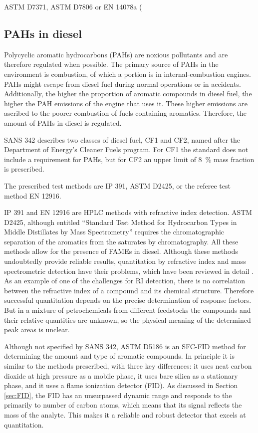 ASTM D7371,
ASTM D7806 or
EN 14078a (

\subsection{PAHs in diesel} 

Polycyclic aromatic hydrocarbons (PAHs) are noxious pollutants and are therefore
regulated when possible. The primary source of PAHs in the environment is
combustion, of which a portion is in internal-combustion engines.  PAHs might
escape from diesel fuel during normal operations or in accidents. Additionally,
the higher the proportion of aromatic compounds in diesel fuel, the higher the
PAH emissions of the engine that uses it. These higher emissions are ascribed to
the poorer combustion of fuels containing aromatics. Therefore, the amount of
PAHs in diesel is regulated.

SANS 342 describes two classes of diesel fuel, CF1 and CF2, named after the
Department of Energy's Cleaner Fuels program. For CF1 the standard does not
include a requirement for PAHs, but for CF2 an upper limit of \SI{8}{\percent}
mass fraction is prescribed.

The prescribed test methods are IP 391, ASTM D2425, or the referee test method
EN 12916.

IP 391 and  EN 12916 are HPLC methods with refractive index detection. ASTM
D2425, although entitled ``Standard Test Method for Hydrocarbon Types in Middle
Distillates by Mass Spectrometry'' requires the chromatographic separation of
the aromatics from the saturates by chromatography. All these methods allow for
the presence of FAMEs in diesel. Although these methods undoubtedly provide
reliable results, quantitation by refractive index and mass spectrometric
detection have their problems, which have been reviewed in detail
\autocite{Kaminski2005}. As an example of one of the challenges for RI
detection, there is no correlation between the refractive index of a compound
and its chemical structure. Therefore successful quantitation depends on the
precise determination of response factors. But in a mixture of petrochemicals
from different feedstocks the compounds and their relative quantities are
unknown, so the physical meaning of the determined peak areas is unclear. 

Although not specified by SANS 342, ASTM D5186 \autocite{ASTMD5186} is an
SFC-FID method for determining the amount and type of aromatic compounds. In
principle it is similar to the methods prescribed, with three key differences:
it uses neat carbon dioxide at high pressure as a mobile phase, it uses bare
silica as a stationary phase, and it uses a flame ionization detector (FID). As
discussed in Section \ref{sec:FID}, the FID has an unsurpassed dynamic range and
responds to the primarily to number of carbon atoms, which means that its signal
reflects the mass of the analyte. This makes it a reliable and robust detector
that excels at quantitation.

